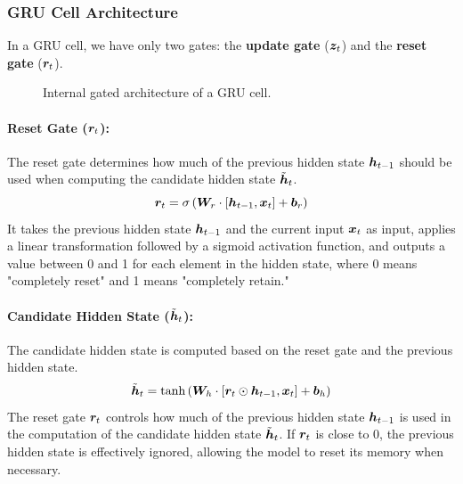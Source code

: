 \subsubsection{GRU Cell Architecture}
In a GRU cell, we have only two gates: the \textbf{update gate} ($\boldsymbol{z}_t$) and the \textbf{reset gate} ($\boldsymbol{r}_t$).

\begin{figure}[H]
    \centering
    \resizebox{.8\textwidth}{!}{
        
    }
    \caption{Internal gated architecture of a GRU cell.}
\end{figure}

\paragraph{Reset Gate ($\boldsymbol{r}_t$):}
The reset gate determines how much of the previous hidden state $\boldsymbol{h}_{t-1}$ should be used when computing the candidate hidden state $\tilde{\boldsymbol{h}}_t$.
\begin{equation}
    \boldsymbol{r}_t = \sigma\left(\boldsymbol{W}_r \cdot [\boldsymbol{h}_{t-1}, \boldsymbol{x}_t] + \boldsymbol{b}_r\right)
\end{equation}
It takes the previous hidden state $\boldsymbol{h}_{t-1}$ and the current input $\boldsymbol{x}_t$ as input, applies a linear transformation followed by a sigmoid activation function,
and outputs a value between 0 and 1 for each element in the hidden state, where 0 means "completely reset" and 1 means "completely retain."

\paragraph{Candidate Hidden State ($\tilde{\boldsymbol{h}}_t$):}
The candidate hidden state is computed based on the reset gate and the previous hidden state.
\begin{equation}
    \tilde{\boldsymbol{h}}_t = \tanh\left(\boldsymbol{W}_h \cdot [\boldsymbol{r}_t \odot \boldsymbol{h}_{t-1}, \boldsymbol{x}_t] + \boldsymbol{b}_h\right)
\end{equation}
The reset gate $\boldsymbol{r}_t$ controls how much of the previous hidden state $\boldsymbol{h}_{t-1}$ is used in the computation of the candidate hidden state $\tilde{\boldsymbol{h}}_t$.
If $\boldsymbol{r}_t$ is close to 0, the previous hidden state is effectively ignored, allowing the model to reset its memory when necessary.

